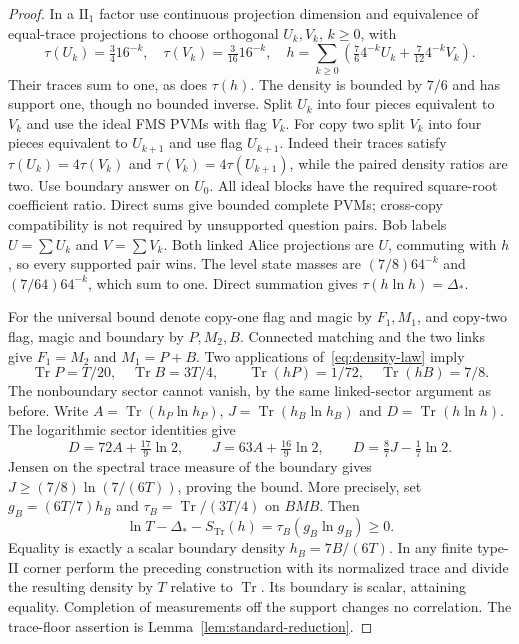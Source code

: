 \begin{proof}
In a $\mathrm{II}_1$ factor use continuous projection dimension and equivalence of equal-trace projections to choose orthogonal $U_k,V_k$, $k\ge0$, with
\[
 \tau(U_k)=\tfrac34 16^{-k},\quad\tau(V_k)=\tfrac3{16}16^{-k},
 \quad h=\sum_{k\ge0}\left(\tfrac76 4^{-k}U_k+\tfrac7{12}4^{-k}V_k\right).
\]
Their traces sum to one, as does $\tau(h)$. The density is bounded by $7/6$ and has support one, though no bounded inverse. Split $U_k$ into four pieces equivalent to $V_k$ and use the ideal FMS PVMs with flag $V_k$. For copy two split $V_k$ into four pieces equivalent to $U_{k+1}$ and use flag $U_{k+1}$. Indeed their traces satisfy $\tau(U_k)=4\tau(V_k)$ and $\tau(V_k)=4\tau(U_{k+1})$, while the paired density ratios are two. Use boundary answer on $U_0$. All ideal blocks have the required square-root coefficient ratio. Direct sums give bounded complete PVMs; cross-copy compatibility is not required by unsupported question pairs. Bob labels $U=\sum U_k$ and $V=\sum V_k$. Both linked Alice projections are $U$, commuting with $h$, so every supported pair wins. The level state masses are $(7/8)64^{-k}$ and $(7/64)64^{-k}$, which sum to one. Direct summation gives $\tau(h\ln h)=\Delta_*$.

For the universal bound denote copy-one flag and magic by $F_1,M_1$, and copy-two flag, magic and boundary by $P,M_2,B$. Connected matching and the two links give $F_1=M_2$ and $M_1=P+B$. Two applications of~\eqref{eq:density-law} imply
\[
 \operatorname{Tr}P=T/20,\quad\operatorname{Tr}B=3T/4,
 \qquad\operatorname{Tr}(hP)=1/72,\quad\operatorname{Tr}(hB)=7/8.
\]
The nonboundary sector cannot vanish, by the same linked-sector argument as before. Write $A=\operatorname{Tr}(h_P\ln h_P)$, $J=\operatorname{Tr}(h_B\ln h_B)$ and $D=\operatorname{Tr}(h\ln h)$. The logarithmic sector identities give
\[
 D=72A+\tfrac{17}{9}\ln2,\qquad
 J=63A+\tfrac{16}{9}\ln2,\qquad
 D=\tfrac87J-\tfrac17\ln2.
\]
Jensen on the spectral trace measure of the boundary gives $J\ge(7/8)\ln(7/(6T))$, proving the bound. More precisely, set $g_B=(6T/7)h_B$ and $\tau_B=\operatorname{Tr}/(3T/4)$ on $BMB$. Then
\[
 \ln T-\Delta_*-S_{\operatorname{Tr}}(h)=\tau_B(g_B\ln g_B)\ge0.
\]
Equality is exactly a scalar boundary density $h_B=7B/(6T)$. In any finite type-II corner perform the preceding construction with its normalized trace and divide the resulting density by $T$ relative to $\operatorname{Tr}$. Its boundary is scalar, attaining equality. Completion of measurements off the support changes no correlation. The trace-floor assertion is Lemma~\ref{lem:standard-reduction}.
\end{proof}

